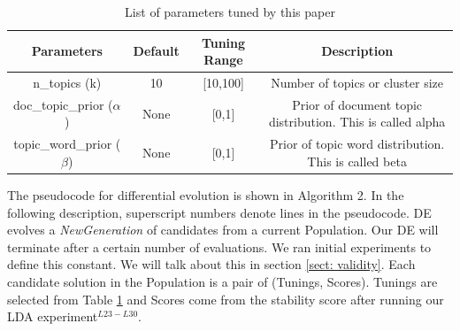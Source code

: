 \documentclass[conference]{IEEEtran}
\theoremstyle{break}
\begin{document}
\begin{center}
\begin{table}[!htb]
{\small
\hfill{} 
\begin{tabular}{|c|c|c|c|}
        \hline 
        \textbf{Parameters} & \textbf{Default} & \textbf{Tuning Range} & \textbf{Description}\\ [0.5ex]
        \hline
        n\_topics (k) & 10 & [10,100] & Number of topics or cluster size \\ [0.5ex]
        \hline
        doc\_topic\_prior ($\alpha$) & None & [0,1] & Prior of document topic distribution. This is called alpha \\ [0.5ex]
        \hline
        topic\_word\_prior ($\beta$) & None & [0,1] & Prior of topic word distribution. This is called  beta \\ [0.5ex]
        \hline
\end{tabular}
}
\hfill{}
\newline
\caption{List of parameters tuned by this paper}
\label{tb:tuned}
\end{table}
\end{center}

The pseudocode for differential evolution is shown in Algorithm 2. In the following description, superscript numbers denote lines in the pseudocode. DE evolves a \textit{NewGeneration} of candidates from a current Population. Our DE will terminate after a certain number of evaluations. We ran initial experiments to define this constant. We will talk about this in section \ref{sect: validity}. Each candidate solution in the Population is a pair of (Tunings, Scores). Tunings are selected from Table \ref{tb:tuned} and Scores come from the stability score after running our LDA experiment$^{L23-L30}$.
\end{document}
